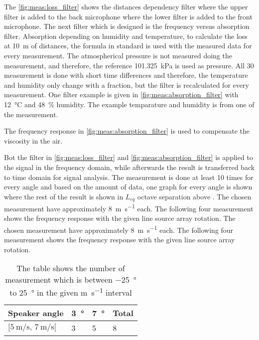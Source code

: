 
The \autoref{fig:meas:loss_filter} shows the distances dependency filter where the upper filter is added to the back microphone where the lower filter is added to the front microphone. The next filter which is designed is the frequency versus absorption filter. 
Absorption depending on humidity and temperature, to calculate the loss at \SI{10}{\meter} of distances, the formula in standard \citep{iso_9613-1} is used with the measured data for every measurement. The atmospherical pressure is not measured doing the measurement, and therefore, the reference \SI{101.325}{\kilo\pascal} is used as pressure. All 30 measurement is done with short time differences and therefore, the temperature and humidity only change with a fraction, but the filter is recalculated for every measurement. One filter example is given in \autoref{fig:meas:absorption_filter} with \SI{12}{\celsius} and \SI{48}{\percent} humidity. The example temparature and humidity is from one of the measurement.

  
 
The frequency response in \autoref{fig:meas:absorption_filter} is used to compensate the viscosity in the air. 

Bot the filter in \autoref{fig:meas:loss_filter} and \autoref{fig:meas:absorption_filter} is applied to the signal in the frequency domain, while afterwards the result is transferred back to time domain for signal analysis.  The measurement is done at least 10 times for every angle and based on the amount of data, one graph for every angle is shown where the rest of the result is shown in $L_{eq}$ octave separation above . The chosen measurement have approximately \SI{8}{\meter\per\second} each. The following four measurement shows the frequency response with the given line source array rotation. The chosen measurement have approximately \SI{8}{\meter\per\second} each. The following four measurement shows the frequency response with the given line source array rotation.
   

\begin{table}[H]
\centering
\caption{The table shows the number of measurement which is between \SI{-25}{\degree} to \SI{25}{\degree} in the given \si{\meter\per\second} interval}
\begin{tabular}{l|l|l|l}
Speaker angle & \SI{3}{\degree}  & \SI{7}{\degree} & Total \\ \hline
$[\SI{5}{\meter\per\second},\, \SI{7}{\meter\per\second}[  $        & 3  & 5  & 8     \\      
\end{tabular}
\label{ta:meas:approved_measurement_par}
\end{table}


